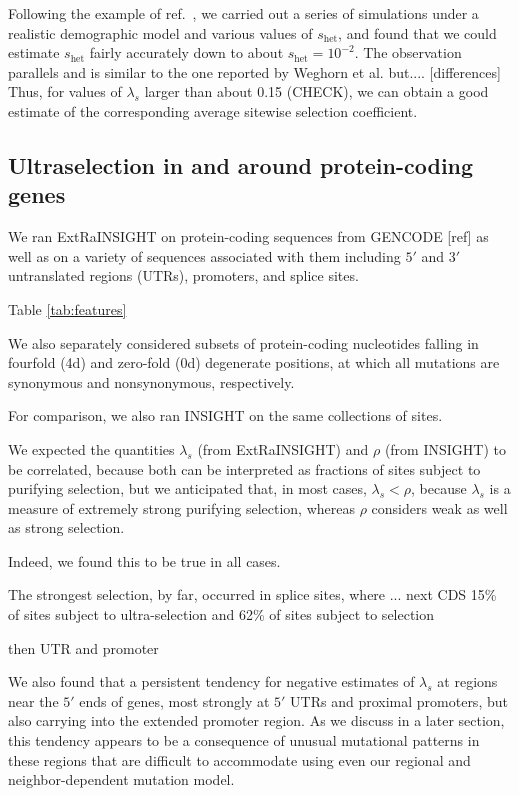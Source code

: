 \documentclass[11pt]{article}
\begin{document}
Following the example of ref.\ \cite{WEGHETAL19}, we carried out a series of simulations 
under a realistic demographic model  and various values of $s_{\text{het}}$, 
and found that we could estimate $s_{\text{het}}$ fairly accurately down to about $s_{\text{het}} = 10^{-2}$.
The observation parallels and is similar to the one reported by Weghorn et al. but.... [differences]
Thus, for values of $\lambda_s$ larger than about 0.15 (CHECK), we can obtain a good estimate of the corresponding average sitewise selection coefficient.

\subsection*{Ultraselection in and around protein-coding genes}

We ran ExtRaINSIGHT on protein-coding sequences from GENCODE [ref]
as well as on a variety of sequences associated with them
including $5'$ and $3'$ untranslated regions (UTRs), promoters,
and splice sites.

Table \ref{tab:features}

We also separately considered subsets of protein-coding nucleotides falling in fourfold (4d) and zero-fold (0d) degenerate positions, at which all mutations are synonymous and nonsynonymous, respectively.

For comparison, we also ran INSIGHT on the same collections of sites.

We expected the quantities $\lambda_s$ (from ExtRaINSIGHT) and $\rho$ (from INSIGHT) to be correlated, because both can be interpreted as fractions of sites subject to purifying selection,
but we anticipated that, in most cases, $\lambda_s < \rho$, because $\lambda_s$ is a measure of extremely strong purifying selection, whereas $\rho$ considers weak as well as strong selection.  


Indeed, we found this to be true in all cases.

The strongest selection, by far, occurred in splice sites, where
...
next CDS
15\% of sites subject to ultra-selection
and 62\% of sites subject to selection


then UTR and promoter

We also found that 
a persistent tendency for negative estimates of $\lambda_s$ at regions near the $5'$ ends of genes, most strongly at $5'$ UTRs and proximal promoters, but also carrying into the extended promoter region.  As we discuss in a later section, this tendency appears to be a consequence of unusual mutational patterns in these regions that are difficult to accommodate using even our regional and neighbor-dependent mutation model.
\end{document}
